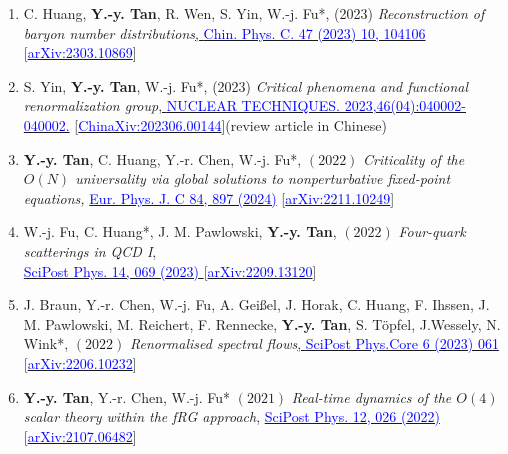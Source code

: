 \documentclass[11pt,a4paper]{article}
\begin{document}
\begin{enumerate}
\item C. Huang, \textbf{Y.-y. Tan}, R. Wen, S. Yin, W.-j. Fu*, (2023) \textit{Reconstruction of baryon number distributions}\href{{https://doi.org/10.1088/1674-1137/aceee1}}{, \textcolor{blue}{Chin. Phys. C. 47 (2023) 10, 104106}} [\href{https://arxiv.org/abs/2303.10869}{\textcolor{blue}{arXiv:2303.10869}}]

\item S. Yin, \textbf{Y.-y. Tan}, W.-j. Fu*, (2023) \textit{Critical phenomena and functional renormalization group}\href{{https://dx.doi.org/10.11889/j.0253-3219.2023.hjs.46.040002}}{, \textcolor{blue}{NUCLEAR TECHNIQUES. 2023,46(04):040002-040002.}} [\href{{http://chinaxiv.org/abs/202306.00144}}{\textcolor{blue}{ChinaXiv:202306.00144}}](review article in Chinese)

\item  {\textbf{Y.-y. Tan}, C. Huang, Y.-r. Chen, W.-j. Fu*}, $\mathrm{(2022)}$ \textit{Criticality of the $O(N)$ universality via global solutions to nonperturbative fixed-point equations,
    } \href{{https://doi.org/10.1140/epjc/s10052-024-13291-7}}{\textcolor{blue}{Eur. Phys. J. C 84, 897 (2024)}} [\href{{https://arxiv.org/abs/2211.10249}}{\textcolor{blue}{arXiv:2211.10249}}]

\item {W.-j. Fu, C. Huang*, J. M. Pawlowski, \textbf{Y.-y. Tan}}, $\mathrm{(2022)}$ \textit{Four-quark scatterings in QCD I},
\\{  \href{{https://doi.org/10.21468/SciPostPhys.14.4.069}}{\textcolor{blue}{SciPost Phys. 14, 069 (2023)} }[\href{{https://arxiv.org/abs/2209.13120}}{\textcolor{blue}{arXiv:2209.13120}}]}

\item {J. Braun, Y.-r. Chen, W.-j. Fu, A. Gei\ss{}el, J. Horak, C. Huang, F. Ihssen, J. M. Pawlowski, M. Reichert, F. Rennecke, \textbf{Y.-y. Tan}, S. T\"opfel, J.Wessely, N. Wink*, $\mathrm{(2022)}$} \textit{Renormalised spectral flows}\href{{https://doi.org/10.21468/SciPostPhysCore.6.3.061}}{, \textcolor{blue}{SciPost Phys.Core 6 (2023) 061}} [\href{{https://arxiv.org/abs/2206.10232}}{\textcolor{blue}{arXiv:2206.10232}}]

\item \textbf{Y.-y. Tan}, Y.-r. Chen, W.-j. Fu* $\mathrm{(2021)}$ \textit{Real-time dynamics of the $O(4)$ scalar theory within the fRG approach}{,  \href{{https://doi.org/10.21468/SciPostPhys.12.1.026}}{\textcolor{blue}{SciPost Phys. 12, 026 (2022)} }[\href{{https://arxiv.org/abs/2107.06482}}{\textcolor{blue}{arXiv:2107.06482}}]}
\end{enumerate}
\vspace{0.4cm}
\end{document}
